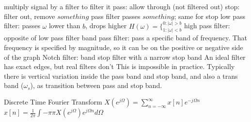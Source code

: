 \documentclass[12pt]{article}
\begin{document}
\begin{multicols*}{2}
\begin{flushleft}
\begin{outline}[longenum]
  \1 multiply signal by a filter to filter it
  \1 pass: allow through (not filtered out)
  \1 stop: filter out, remove
  \1 $something$ pass filter passes $something$; same for stop
  \1 low pass filter: passes $\omega$ lower than $b$, drops higher
    $H(\omega)=\{ _{1:|\omega|<b}^{0:|\omega|>b}$
  \1 high pass filter: opposite of low pass filter
  \1 band pass filter: pass a specific band of frequency.
    \2 That frequency is specified by magnitude, so it can be on the positive or negative side of the graph
  \1 Notch filter: band stop filter with a narrow stop band
  \1 An ideal filter has exact edges, but real filters don't
    \2 This is impossible in practice. 
      Typically there is vertical variation inside the pass band and stop band, and also a trans band ($\omega_s$), as transition between pass and stop band.

  \1 Discrete Time Fourier Transform
  \1 $X(e^{j\Omega}) = \sum_{n=-\infty}^{\infty} x[n] e^{-j\Omega n}$
  \1 $x[n] = \frac{1}{2\pi} \int{-\pi}{\pi} X(e^{j\Omega}) e^{j\Omega n} d\Omega$

\end{outline}
\end{flushleft}
\end{multicols*}
\end{document}
